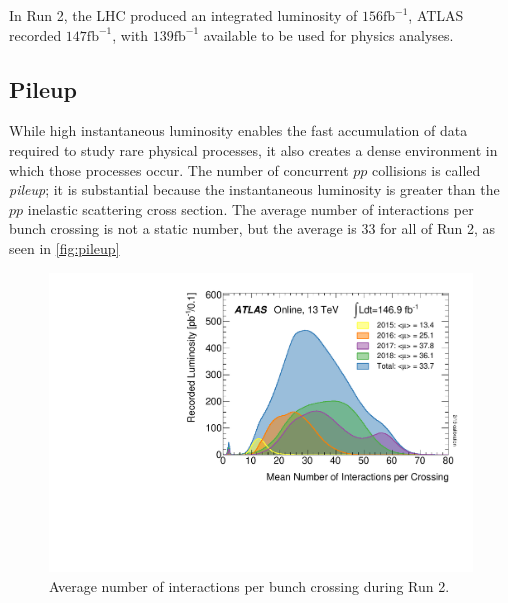 In Run 2, the \ac{LHC} produced an integrated luminosity of $156 \textrm{fb}^{-1}$, \ac{ATLAS} recorded $147 \textrm{fb}^{-1}$, with $139 \textrm{fb}^{-1}$ available to be used for physics analyses.



\subsection{Pileup}

While high instantaneous luminosity enables the fast accumulation of data required to study rare physical processes, it also creates a dense environment in which those processes occur. The number of concurrent $pp$ collisions is called \emph{pileup}; it is substantial because the instantaneous luminosity is greater than the $pp$ inelastic scattering cross section. The average number of interactions per bunch crossing is not a static number, but the average is $33$ for all of Run 2, as seen in \autoref{fig:pileup}

\begin{figure}[htbp]
\centering
\includegraphics[width=.8\textwidth]{figures/Detector/lhc-mu.pdf}
\caption{Average number of interactions per bunch crossing during Run 2. }
\label{fig:pileup}
\end{figure}


